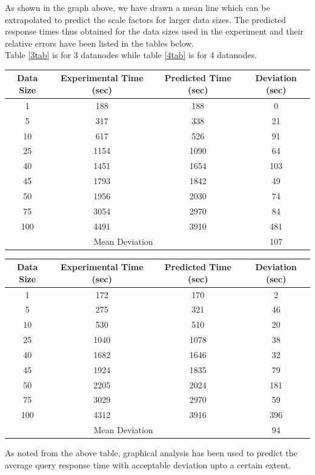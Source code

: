 \documentclass[12pt]{book}
\begin{document}
As shown in the graph above, we have drawn a mean line which can be extrapolated to predict the scale factors for larger data sizes.
The predicted response times thus obtained for the data sizes used in the experiment and their relative errors have been listed
in the tables below. \\\noindent
Table \ref{3tab} is for 3 datanodes while table \ref{4tab} is for 4 datanodes.\\
\begin{center}
\label{3tab}
\begin{tabular}{|c|c|c|c|}\hline
Data Size & Experimental Time (sec) & Predicted Time (sec) & Deviation (sec) \\\hline
1 & 188 & 188 & 0\\
5 & 317 & 338 & 21\\
10 & 617 & 526 & 91\\
25 & 1154 & 1090 & 64\\
40 & 1451 & 1654 & 103\\
45 & 1793 & 1842 & 49\\
50 & 1956 & 2030 & 74\\
75 & 3054 & 2970 & 84\\
100 & 4491 & 3910 & 481\\\hline
\multicolumn{3}{|c|}{Mean Deviation} & 107\\\hline
\end{tabular}
\end{center}

\begin{center}
\label{4tab}
\begin{tabular}{|c|c|c|c|}\hline
Data Size & Experimental Time (sec) & Predicted Time (sec) & Deviation (sec) \\\hline
1 & 172 & 170 & 2\\
5 & 275 & 321 & 46\\
10 & 530 & 510 & 20\\
25 & 1040 & 1078 & 38\\
40 & 1682 & 1646 & 32\\
45 & 1924 & 1835 & 79\\
50 & 2205 & 2024 & 181\\
75 & 3029 & 2970 & 59\\
100 & 4312 & 3916 & 396\\\hline
\multicolumn{3}{|c|}{Mean Deviation} & 94\\\hline
\end{tabular}
\end{center}
\noindent
As noted from the above table, graphical analysis has been used to predict the average query response time with acceptable deviation
upto a certain extent.
\end{document}
